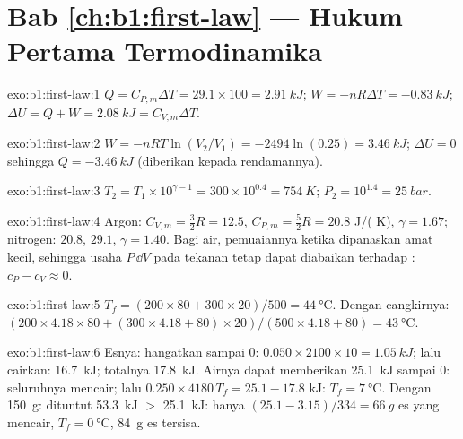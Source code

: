 \section*{Bab \ref{ch:b1:first-law} --- Hukum Pertama Termodinamika}

\begin{solution}{exo:b1:first-law:1}
$Q = C_{P,m}\Delta T = 29.1 \times 100 = \qty{2.91}{kJ}$; $W = -nR\Delta T =
\qty{-0.83}{kJ}$; $\Delta U = Q + W = \qty{2.08}{kJ} = C_{V,m}\Delta T$.
\end{solution}

\begin{solution}{exo:b1:first-law:2}
$W = -nRT\ln(V_2/V_1) = -2494\ln(0.25) = \qty{+3.46}{kJ}$; $\Delta U = 0$ sehingga
$Q = \qty{-3.46}{kJ}$ (diberikan kepada rendamannya).
\end{solution}

\begin{solution}{exo:b1:first-law:3}
$T_2 = T_1 \times 10^{\gamma - 1} = 300 \times 10^{0.4} = \qty{754}{K}$; $P_2 =
10^{1.4} = \qty{25}{bar}$.
\end{solution}

\begin{solution}{exo:b1:first-law:4}
Argon: $C_{V,m} = \tfrac32 R = 12.5$, $C_{P,m} = \tfrac52 R = 20.8$ J/( K),
$\gamma = 1.67$; nitrogen: $20.8$, $29.1$, $\gamma = 1.40$. Bagi air,
pemuaiannya ketika dipanaskan amat kecil, sehingga usaha $P\,\dd V$ pada tekanan tetap
dapat diabaikan terhadap : $c_P - c_V \approx 0$.
\end{solution}

\begin{solution}{exo:b1:first-law:5}
$T_f = (200 \times 80 + 300 \times 20)/500 = \qty{44}{\degreeCelsius}$. Dengan
cangkirnya: $(200 \times 4.18 \times 80 + (300 \times 4.18 + 80) \times 20)/(500 \times
4.18 + 80) = \qty{43}{\degreeCelsius}$.
\end{solution}

\begin{solution}{exo:b1:first-law:6}
Esnya: hangatkan sampai $0$: $0.050 \times 2100 \times 10 = \qty{1.05}{kJ}$; lalu cairkan:
\qty{16.7}{kJ}; totalnya \qty{17.8}{kJ}. Airnya dapat memberikan \qty{25.1}{kJ} sampai
$0$: seluruhnya mencair; lalu $0.250 \times 4180\,T_f = 25.1 - 17.8$ kJ: $T_f =
\qty{7}{\degreeCelsius}$. Dengan \qty{150}{g}: dituntut \qty{53.3}{kJ} $>$ \qty{25.1}{kJ}:
hanya $(25.1 - 3.15)/334 = \qty{66}{g}$ es yang mencair, $T_f = \qty{0}{\degreeCelsius}$,
\qty{84}{g} es tersisa.
\end{solution}

